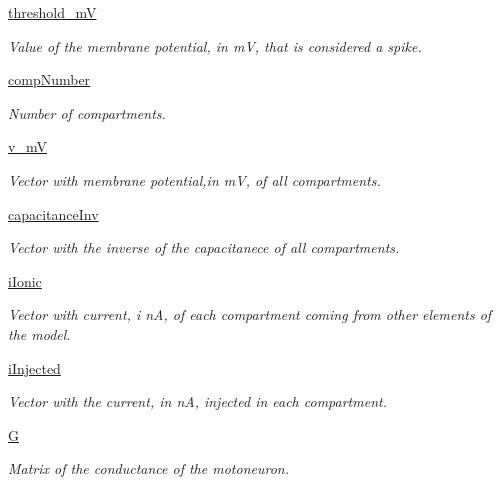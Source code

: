 \begin{DoxyCompactItemize}
\hyperlink{class_motor_unit_1_1_motor_unit_affbd0b90f1dce6a0f929775e54f8c212}{threshold\-\_\-m\-V}
\begin{DoxyCompactList}\small\item\em Value of the membrane potential, in m\-V, that is considered a spike. \end{DoxyCompactList}\item 
\hyperlink{class_motor_unit_1_1_motor_unit_afe7281fb12c41102980b6b48d5a49713}{comp\-Number}
\begin{DoxyCompactList}\small\item\em Number of compartments. \end{DoxyCompactList}\item 
\hyperlink{class_motor_unit_1_1_motor_unit_aa8968f89250895ae2ae572e9106709f2}{v\-\_\-m\-V}
\begin{DoxyCompactList}\small\item\em Vector with membrane potential,in m\-V, of all compartments. \end{DoxyCompactList}\item 
\hyperlink{class_motor_unit_1_1_motor_unit_a0cf2afb5bd12374db56b9d9a5a1671e6}{capacitance\-Inv}
\begin{DoxyCompactList}\small\item\em Vector with the inverse of the capacitanece of all compartments. \end{DoxyCompactList}\item 
\hyperlink{class_motor_unit_1_1_motor_unit_a0541858216e7d01582312f9a7a99d595}{i\-Ionic}
\begin{DoxyCompactList}\small\item\em Vector with current, i n\-A, of each compartment coming from other elements of the model. \end{DoxyCompactList}\item 
\hyperlink{class_motor_unit_1_1_motor_unit_a06045eca379d38892670a491dbac0829}{i\-Injected}
\begin{DoxyCompactList}\small\item\em Vector with the current, in n\-A, injected in each compartment. \end{DoxyCompactList}\item 
\hyperlink{class_motor_unit_1_1_motor_unit_a9b9f157ab92b47470ca7ec6bd3473dd3}{G}
\begin{DoxyCompactList}\small\item\em Matrix of the conductance of the motoneuron. \end{DoxyCompactList}\item 

\end{DoxyCompactItemize}

